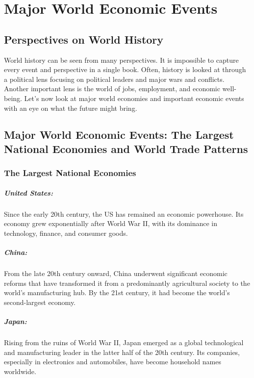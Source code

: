 \chapter{Major World Economic Events}
\section*{Perspectives on World History}
World history can be seen from many perspectives. It is impossible to capture every event and perspective in a single book. Often, history is looked at through a political lens focusing on political leaders and major wars and conflicts. Another important lens is the world of jobs, employment, and economic well-being. Let's now look at major world economies and important economic events with an eye on what the future might bring.

\section*{Major World Economic Events: The Largest National Economies and World Trade Patterns}
\subsection*{The Largest National Economies}

\paragraph{United States:}
Since the early 20th century, the US has remained an economic powerhouse. Its economy grew exponentially after World War II, with its dominance in technology, finance, and consumer goods.

\paragraph{China:}
From the late 20th century onward, China underwent significant economic reforms that have transformed it from a predominantly agricultural society to the world's manufacturing hub. By the 21st century, it had become the world's second-largest economy.

\paragraph{Japan:}
Rising from the ruins of World War II, Japan emerged as a global technological and manufacturing leader in the latter half of the 20th century. Its companies, especially in electronics and automobiles, have become household names worldwide.

